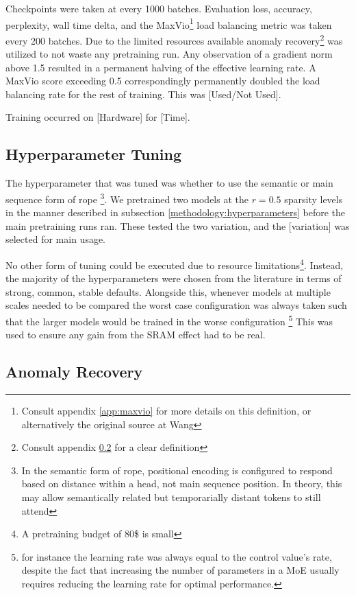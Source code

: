 \documentclass[11pt]{article}
\begin{document}
Checkpoints were taken at every 1000 batches. Evaluation loss, accuracy, perplexity, wall time delta, and the MaxVio\footnote{Consult appendix \ref{app:maxvio} for more details on this definition, or alternatively the original source at Wang\cite{wang2024auxiliarylossfree}} load balancing metric was taken every 200 batches. Due to the limited resources available anomaly recovery\footnote{Consult appendix \ref{app:anomaly_recovery} for a clear definition} was utilized to not waste any pretraining run. Any observation of a gradient norm above 1.5 resulted in a permanent halving of the effective learning rate. A MaxVio score exceeding 0.5 correspondingly permanently doubled the load balancing rate for the rest of training. This was [Used/Not Used].

Training occurred on [Hardware] for [Time].


\subsection{Hyperparameter Tuning}
\label{app:hyperparameter_tuning}

The  hyperparameter that was tuned was whether to use the semantic or main sequence form of rope \footnote{In the semantic form of rope, positional encoding is configured to respond based on distance within a head, not main sequence position. In theory, this may allow semantically related but temporarially distant tokens to still attend}. We pretrained two models at the $r=0.5$ sparsity levels in the manner described in subsection \ref{methodology:hyperparameters} before the main pretraining runs ran. These tested the two variation, and the [variation] was selected for main usage.

No other form of tuning could be executed due to resource limitations\footnote{A pretraining budget of 80\$ is small}. Instead, the majority of the hyperparameters were chosen from the literature in terms of strong, common, stable defaults. Alongside this, whenever models at multiple scales needed to be compared the worst case configuration was always taken such that the larger models would be trained in the worse configuration \footnote{for instance the learning rate was always equal to the control value's rate, despite the fact that increasing the number of parameters in a MoE usually requires reducing the learning rate for optimal performance.} This was used to ensure any gain from the SRAM effect had to be real.


\subsection{Anomaly Recovery}
\label{app:anomaly_recovery}
\end{document}
